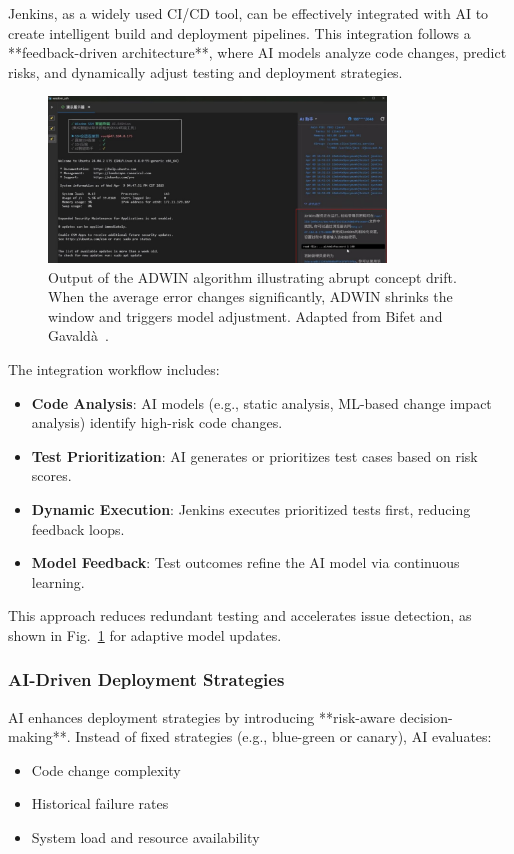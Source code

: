 \documentclass[manuscript,screen,review]{acmart}
\begin{document}
Jenkins, as a widely used CI/CD tool, can be effectively integrated with AI to create intelligent build and deployment pipelines. This integration follows a **feedback-driven architecture**, where AI models analyze code changes, predict risks, and dynamically adjust testing and deployment strategies.

\begin{figure}[H]
  \centering
  \includegraphics[width=0.8\textwidth]{picture/jenkins+ai+cursor.pdf}
  \caption{Output of the ADWIN algorithm illustrating abrupt concept drift. When the average error changes significantly, ADWIN shrinks the window and triggers model adjustment. Adapted from Bifet and Gavaldà~\cite{Bifet2007}.}
  \label{fig:adwin}
\end{figure}

The integration workflow includes:
\begin{itemize}
    \item \textbf{Code Analysis}: AI models (e.g., static analysis, ML-based change impact analysis) identify high-risk code changes.
    \item \textbf{Test Prioritization}: AI generates or prioritizes test cases based on risk scores.
    \item \textbf{Dynamic Execution}: Jenkins executes prioritized tests first, reducing feedback loops.
    \item \textbf{Model Feedback}: Test outcomes refine the AI model via continuous learning.
\end{itemize}

This approach reduces redundant testing and accelerates issue detection, as shown in Fig.~\ref{fig:adwin} for adaptive model updates.

\subsubsection{AI-Driven Deployment Strategies}

AI enhances deployment strategies by introducing **risk-aware decision-making**. Instead of fixed strategies (e.g., blue-green or canary), AI evaluates:
\begin{itemize}
    \item Code change complexity
    \item Historical failure rates
    \item System load and resource availability
\end{itemize}
\end{document}
